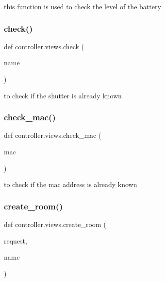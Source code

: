 this function is used to check the level of the battery 

\mbox{\label{namespacecontroller_1_1views_a6a41caa9cb6c4b959968a86d3c899db2}} 
\subsubsection{\texorpdfstring{check()}{check()}}
{\footnotesize\ttfamily def controller.\+views.\+check (\begin{DoxyParamCaption}\item[{}]{name }\end{DoxyParamCaption})}



to check if the shutter is already known 

\mbox{\label{namespacecontroller_1_1views_ac98b114197f615cf64579478f0af28c0}} 
\subsubsection{\texorpdfstring{check\+\_\+mac()}{check\_mac()}}
{\footnotesize\ttfamily def controller.\+views.\+check\+\_\+mac (\begin{DoxyParamCaption}\item[{}]{mac }\end{DoxyParamCaption})}



to check if the mac address is already known 

\mbox{\label{namespacecontroller_1_1views_a0a946610cad4aa4fc8684e3f1b16d831}} 
\subsubsection{\texorpdfstring{create\+\_\+room()}{create\_room()}}
{\footnotesize\ttfamily def controller.\+views.\+create\+\_\+room (\begin{DoxyParamCaption}\item[{}]{request,  }\item[{}]{name }\end{DoxyParamCaption})}



